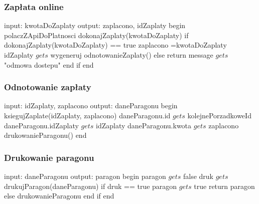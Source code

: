 \subsubsection{Zapłata online}
\begin{algorithm}[caption={7.4.1 Zapłata online}, label={alg1}]
  input: kwotaDoZaplaty
  output: zaplacono, idZaplaty
begin
  polaczZApiDoPlatnosci
  dokonajZaplaty(kwotaDoZaplaty)
  if dokonajZaplaty(kwotaDoZaplaty) == true 
    zaplacono =kwotaDoZaplaty
    idZaplaty $gets$ wygeneruj
    odnotowanieZaplaty()
  else
    return message $gets$ "odmowa dostepu"
  end if
end
\end{algorithm}

\subsubsection{Odnotowanie zapłaty}
\begin{algorithm}[caption={7.5 Odnotowanie zapłaty}, label={alg1}]
  input: idZaplaty, zaplacono
  output: daneParagonu
begin
  ksiegujZaplate(idZaplaty, zaplacono)
  daneParagonu.id $gets$ kolejnePorzadkoweId
  daneParagonu.idZaplaty $gets$ idZaplaty
  daneParagonu.kwota $gets$ zaplacono
  drukowanieParagonu()
end
\end{algorithm}

\subsubsection{Drukowanie paragonu}
\begin{algorithm}[caption={7.6 Drukowanie paragonu}, label={alg1}]
  input: daneParagonu
  output: paragon
begin
  paragon $gets$ false
  druk $gets$ drukujParagon(daneParagonu)
  if druk == true 
    paragon $gets$ true
    return paragon
  else
    drukowanieParagonu
  end if
end
\end{algorithm}

